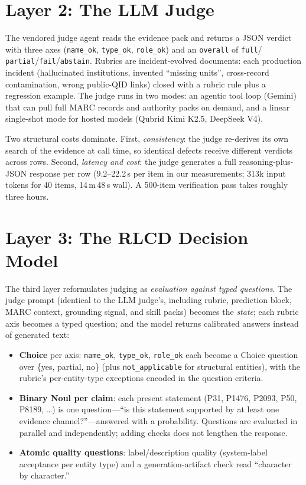 \documentclass{llncs}
\begin{document}
\section{Layer 2: The LLM Judge}
\label{sec:llm}

The vendored judge agent reads the evidence pack and returns a JSON
verdict with three axes (\texttt{name\_ok}, \texttt{type\_ok},
\texttt{role\_ok}) and an \texttt{overall} of \texttt{full}/%
\texttt{partial}/\texttt{fail}/\texttt{abstain}. Rubrics are
incident-evolved documents: each production incident (hallucinated
institutions, invented ``missing units'', cross-record contamination,
wrong public-QID links) closed with a rubric rule plus a regression
example. The judge runs in two modes: an agentic tool loop (Gemini) that
can pull full MARC records and authority packs on demand, and a linear
single-shot mode for hosted models (Qubrid Kimi K2.5, DeepSeek V4).

Two structural costs dominate. First, \emph{consistency}: the judge
re-derives its own search of the evidence at call time, so identical
defects receive different verdicts across rows. Second, \emph{latency and
cost}: the judge generates a full reasoning-plus-JSON response per row
(9.2--22.2\,s per item in our measurements; 313k input tokens for 40 items,
14\,m\,48\,s wall). A 500-item verification pass takes roughly three hours.

\section{Layer 3: The RLCD Decision Model}
\label{sec:jev}

The third layer reformulates judging as \emph{evaluation against typed
questions}. The judge prompt (identical to the LLM judge's, including
rubric, prediction block, MARC context, grounding signal, and skill
packs) becomes the \emph{state}; each rubric axis becomes a typed
question; and the model returns calibrated answers instead of generated
text:

\begin{itemize}
\item \textbf{Choice} per axis: \texttt{name\_ok}, \texttt{type\_ok},
  \texttt{role\_ok} each become a Choice question over
  \{yes, partial, no\} (plus \texttt{not\_applicable} for structural
  entities), with the rubric's per-entity-type exceptions encoded in the
  question criteria.
\item \textbf{Binary Noul per claim}: each present statement (P31, P1476,
  P2093, P50, P8189, \dots) is one question---``is this statement
  supported by at least one evidence channel?''---answered with a
  probability. Questions are evaluated in parallel and independently;
  adding checks does not lengthen the response.
\item \textbf{Atomic quality questions}: label/description quality
  (system-label acceptance per entity type) and a generation-artifact
  check read ``character by character.''
\end{itemize}
\end{document}
